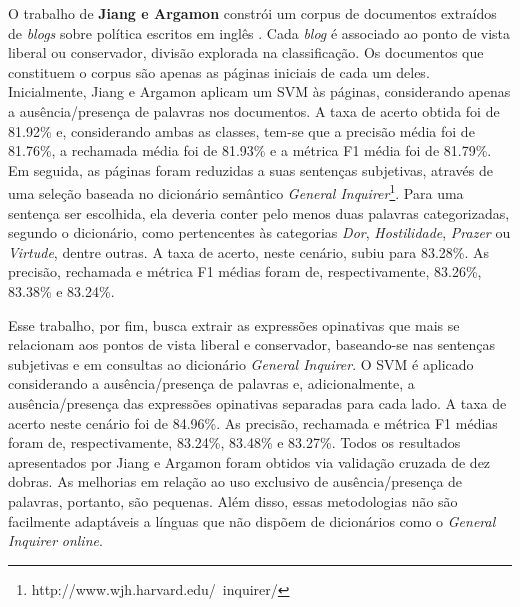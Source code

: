 O trabalho de \textbf{Jiang e Argamon} constrói um corpus de documentos extraídos de \emph{blogs} sobre política escritos em inglês \cite{jiang-argamon}. Cada \emph{blog} é associado ao ponto de vista liberal ou conservador, divisão explorada na classificação. Os documentos que constituem o corpus são apenas as páginas iniciais de cada um deles. Inicialmente, Jiang e Argamon aplicam um SVM às páginas, considerando apenas a ausência/presença de palavras nos documentos. A taxa de acerto obtida foi de 81.92\% e, considerando ambas as classes, tem-se que a precisão média foi de 81.76\%, a rechamada média foi de 81.93\% e a métrica F1 média foi de 81.79\%. Em seguida, as páginas foram reduzidas a suas sentenças subjetivas, através de uma seleção baseada no dicionário semântico \emph{General Inquirer}\footnote{http://www.wjh.harvard.edu/~inquirer/}. Para uma sentença ser escolhida, ela deveria conter pelo menos duas palavras categorizadas, segundo o dicionário, como pertencentes às categorias \emph{Dor}, \emph{Hostilidade}, \emph{Prazer} ou \emph{Virtude}, dentre outras. A taxa de acerto, neste cenário, subiu para 83.28\%. As precisão, rechamada e métrica F1 médias foram de, respectivamente, 83.26\%, 83.38\% e 83.24\%. 

Esse trabalho, por fim, busca extrair as expressões opinativas que mais se relacionam aos pontos de vista liberal e conservador, baseando-se nas sentenças subjetivas e em consultas ao dicionário \emph{General Inquirer}. O SVM é aplicado considerando a ausência/presença de palavras e, adicionalmente, a ausência/presença das expressões opinativas separadas para cada lado. A taxa de acerto neste cenário foi de 84.96\%. As precisão, rechamada e métrica F1 médias foram de, respectivamente, 83.24\%, 83.48\% e 83.27\%. Todos os resultados apresentados por Jiang e Argamon foram obtidos via validação cruzada de dez dobras. As melhorias em relação ao uso exclusivo de ausência/presença de palavras, portanto, são pequenas. Além disso, essas metodologias não são facilmente adaptáveis a línguas que não dispõem de dicionários como o \emph{General Inquirer} \emph{online}.



